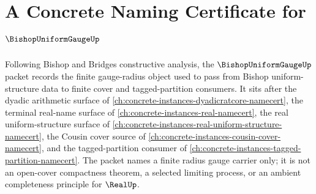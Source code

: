 \chapter{A Concrete Naming Certificate for $\BishopUniformGaugeUp$}
\label{ch:concrete-instances-bishop-uniform-gauge-namecert}

Following Bishop and Bridges constructive analysis, the $\BishopUniformGaugeUp$ packet records the finite gauge-radius object used to pass from Bishop uniform-structure data to finite cover and tagged-partition consumers. It sits after the dyadic arithmetic surface of \autoref{ch:concrete-instances-dyadicratcore-namecert}, the terminal real-name surface of \autoref{ch:concrete-instances-real-namecert}, the real uniform-structure surface of \autoref{ch:concrete-instances-real-uniform-structure-namecert}, the Cousin cover source of \autoref{ch:concrete-instances-cousin-cover-namecert}, and the tagged-partition consumer of \autoref{ch:concrete-instances-tagged-partition-namecert}. The packet names a finite radius gauge carrier only; it is not an open-cover compactness theorem, a selected limiting process, or an ambient completeness principle for $\RealUp$.

